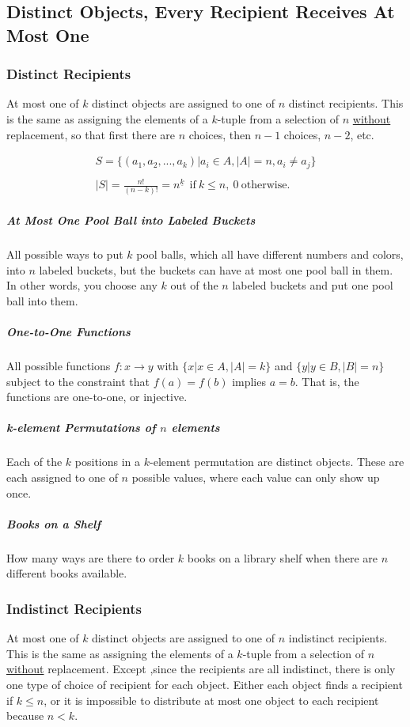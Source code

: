\subsection{Distinct Objects, Every Recipient Receives At Most One}

\subsubsection{Distinct Recipients}
At most one of $k$ distinct objects are assigned to one of $n$ distinct recipients. This is the same as assigning the elements of a $k$-tuple from a selection of $n$ \underline{without} replacement, so that first there are $n$ choices, then $n-1$ choices, $n-2$, etc.

\begin{equation}	
\begin{array}{l}
S = \{ (a_1,a_2,...,a_k) | a_i \in A, |A| = n, a_i\neq a_j\}\\
\\
|S| = \frac{n!}{(n-k)!} = n^{\underline{k}}\ \ \mathrm{if\ }k\leq n,\ 0\ \mathrm{otherwise.}
\end{array}
\end{equation}

\subparagraph{At Most One Pool Ball into Labeled Buckets} All possible ways to put $k$ pool balls, which all have different numbers and colors, into $n$ labeled buckets, but the buckets can have at most one pool ball in them. In other words, you choose any $k$ out of the $n$ labeled buckets and put one pool ball into them. 

\subparagraph{One-to-One Functions} All possible functions $f:x \rightarrow y$ with $\{x | x\in A, |A| = k \}$ and $\{y | y\in B, |B| = n\}$ subject to the constraint that $f(a) = f(b)$ implies $a=b$. That is, the functions are one-to-one, or injective.

\subparagraph{k-element Permutations of $n$ elements}  Each of the $k$ positions in a $k$-element permutation are distinct objects. These are each assigned to one of $n$ possible values, where each value can only show up once. 

\subparagraph{Books on a Shelf} How many ways are there to order $k$ books on a library shelf when there are $n$ different books available. 


\subsubsection{Indistinct Recipients}
At most one of $k$ distinct objects are assigned to one of $n$ indistinct recipients. This is the same as assigning the elements of a $k$-tuple from a selection of $n$ \underline{without} replacement. Except ,since the recipients are all indistinct, there is only one type of choice of recipient for each object. Either each object finds a recipient if $k\leq n$, or it is impossible to distribute at most one object to each recipient because $n < k$.


